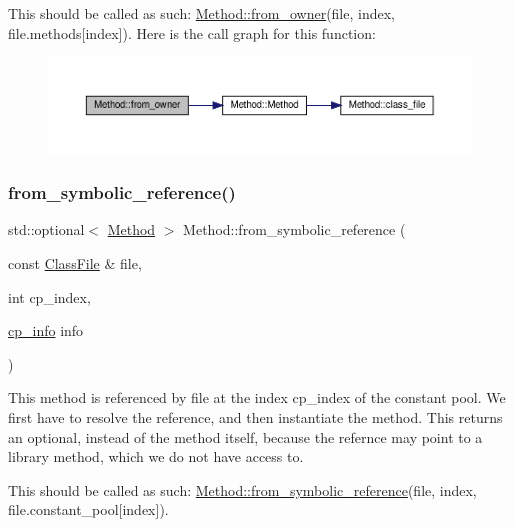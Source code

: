 This should be called as such\+: \hyperlink{classMethod_ad977afdb14569e1108c6b6849fe0b007}{Method\+::from\+\_\+owner}(file, index, file.\+methods\mbox{[}index\mbox{]}). Here is the call graph for this function\+:
\nopagebreak
\begin{figure}[H]
\begin{center}
\leavevmode
\includegraphics[width=350pt]{classMethod_ad977afdb14569e1108c6b6849fe0b007_cgraph}
\end{center}
\end{figure}
\mbox{\label{classMethod_adddc54ce699dfb1ba305595507085a29}} 
\subsubsection{\texorpdfstring{from\+\_\+symbolic\+\_\+reference()}{from\_symbolic\_reference()}}
{\footnotesize\ttfamily std\+::optional$<$ \hyperlink{classMethod}{Method} $>$ Method\+::from\+\_\+symbolic\+\_\+reference (\begin{DoxyParamCaption}\item[{const \hyperlink{classfile_8h_a00b46b60bc40e813e9fb1bb049174346}{Class\+File} \&}]{file,  }\item[{int}]{cp\+\_\+index,  }\item[{\hyperlink{structcp__info}{cp\+\_\+info}}]{info }\end{DoxyParamCaption})\hspace{0.3cm}{\ttfamily [static]}}

This method is referenced by {\ttfamily file} at the index {\ttfamily cp\+\_\+index} of the constant pool. We first have to resolve the reference, and then instantiate the method. This returns an optional, instead of the method itself, because the refernce may point to a library method, which we do not have access to.

This should be called as such\+: \hyperlink{classMethod_adddc54ce699dfb1ba305595507085a29}{Method\+::from\+\_\+symbolic\+\_\+reference}(file, index, file.\+constant\+\_\+pool\mbox{[}index\mbox{]}).


